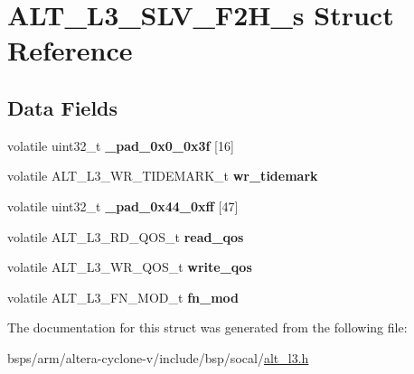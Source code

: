 \hypertarget{structALT__L3__SLV__F2H__s}{}\section{A\+L\+T\+\_\+\+L3\+\_\+\+S\+L\+V\+\_\+\+F2\+H\+\_\+s Struct Reference}
\label{structALT__L3__SLV__F2H__s}
\subsection*{Data Fields}
\begin{DoxyCompactItemize}
\item 
\mbox{\label{structALT__L3__SLV__F2H__s_af6a15a3f520a1fd2230b18c593fe1b43}} 
volatile uint32\+\_\+t {\bfseries \+\_\+pad\+\_\+0x0\+\_\+0x3f} \mbox{[}16\mbox{]}
\item 
\mbox{\label{structALT__L3__SLV__F2H__s_aa0a4d7134b0a9fc8f578bc25b9a6ac6e}} 
volatile A\+L\+T\+\_\+\+L3\+\_\+\+W\+R\+\_\+\+T\+I\+D\+E\+M\+A\+R\+K\+\_\+t {\bfseries wr\+\_\+tidemark}
\item 
\mbox{\label{structALT__L3__SLV__F2H__s_a2130a6743604219bd306927dbd6085bf}} 
volatile uint32\+\_\+t {\bfseries \+\_\+pad\+\_\+0x44\+\_\+0xff} \mbox{[}47\mbox{]}
\item 
\mbox{\label{structALT__L3__SLV__F2H__s_aa680d71d5811ab0402065708f185a2be}} 
volatile A\+L\+T\+\_\+\+L3\+\_\+\+R\+D\+\_\+\+Q\+O\+S\+\_\+t {\bfseries read\+\_\+qos}
\item 
\mbox{\label{structALT__L3__SLV__F2H__s_aa9845ab9c7e37f8684434b1232fb1d28}} 
volatile A\+L\+T\+\_\+\+L3\+\_\+\+W\+R\+\_\+\+Q\+O\+S\+\_\+t {\bfseries write\+\_\+qos}
\item 
\mbox{\label{structALT__L3__SLV__F2H__s_aa36e42a196c06d288b67733abdca43c4}} 
volatile A\+L\+T\+\_\+\+L3\+\_\+\+F\+N\+\_\+\+M\+O\+D\+\_\+t {\bfseries fn\+\_\+mod}
\end{DoxyCompactItemize}


The documentation for this struct was generated from the following file\+:\begin{DoxyCompactItemize}
\item 
bsps/arm/altera-\/cyclone-\/v/include/bsp/socal/\mbox{\hyperlink{alt__l3_8h}{alt\+\_\+l3.\+h}}\end{DoxyCompactItemize}
